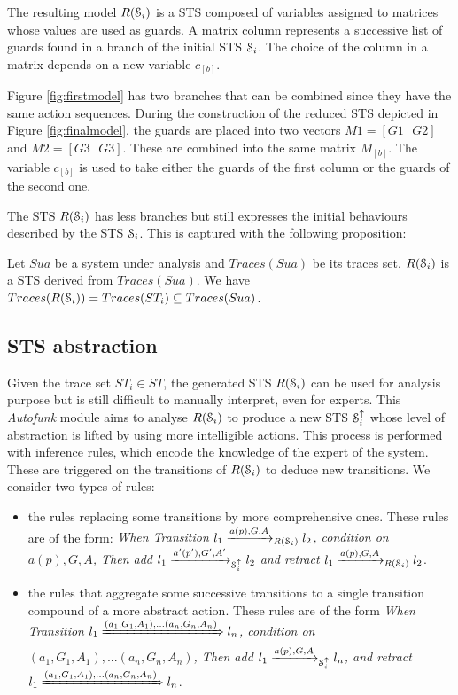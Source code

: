 The resulting model $R(\EuScript{S}_i)$ is a STS composed of
variables assigned to matrices whose values are used as guards. A
matrix column represents a successive list of guards found in a
branch of the initial STS $\EuScript{S}_i$. The choice of the
column in a matrix depends on a new variable $c_{[b]}$.

Figure \ref{fig:firstmodel} has two branches that can be combined
since they have the same action sequences. During the construction
of the reduced STS depicted in Figure \ref{fig:finalmodel}, the
guards are placed into two vectors $M1=[G1\text{ }G2]$ and $M2=[G3\text{ }G3]$.
These are combined into the same matrix $M_{[b]}$. The variable
$c_{[b]}$ is used to take either the guards of the first column or
the guards of the second one.

The STS $R(\EuScript{S}_i)$ has less branches but still expresses
the initial behaviours described by the STS $\EuScript{S}_i$.
This is captured with the following proposition:

\begin{proposition}
    Let $Sua$ be a system under analysis and $Traces(Sua)$ be its traces
    set. $R(\EuScript{S}_i)$ is a STS derived from $Traces(Sua)$.
    We have $Traces(R(\EuScript{S}_i)) = Traces(ST_i) \subseteq Traces(Sua)$.
\end{proposition}

\subsection{STS abstraction}

Given the trace set $ST_i \in ST$, the
generated STS $R(\EuScript{S}_i)$ can be used for analysis
purpose but is still difficult to manually interpret, even for experts.
This \textit{Autofunk} module aims to analyse $R(\EuScript{S}_i)$
to produce a new STS $\EuScript{S}_i^\uparrow$ whose level of
abstraction is lifted by using more intelligible actions. This
process is performed with inference rules, which encode the
knowledge of the expert of the system. These are triggered on the
transitions of $R(\EuScript{S}_i)$ to deduce new transitions. We
consider two types of rules:

\begin{itemize}
    \item the rules replacing some transitions by more
    comprehensive ones. These rules are of the form: \textit{When
    Transition $l_1 \xrightarrow{a(p),G,A}_{R(\EuScript{S}_i)}
    l_2$, condition on $a(p),G,A$, Then add $l_1
    \xrightarrow{a'(p'),G',A'}_{\EuScript{S}_i^\uparrow} l_2$ and
    retract $l_1 \xrightarrow{a(p),G,A}_{R(\EuScript{S}_i)} l_2$}.

    \item the rules that aggregate some successive transitions
    to a single transition compound of a more abstract action.
    These rules are of the form \textit{When Transition $l_1
    \xRightarrow{(a_1,G_1,A_1),...(a_n,G_n,A_n)} l_n$, condition
    on\\$(a_1,G_1,A_1),...(a_n,G_n,A_n)$, Then add $l_1
    \xrightarrow{a(p),G,A}_{\EuScript{S}_i^\uparrow} l_n $, and
    retract $l_1 \xRightarrow{(a_1,G_1,A_1),...(a_n,G_n,A_n)} l_n$}.
\end{itemize}

